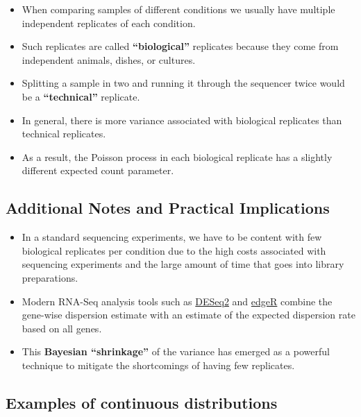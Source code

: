\documentclass[
]{book}
\providecommand{\tightlist}{%
  \setlength{\itemsep}{0pt}\setlength{\parskip}{0pt}}
\begin{document}
\begin{itemize}
\tightlist
\item
  When comparing samples of different conditions we usually have multiple independent replicates of each condition.
\item
  Such replicates are called \textbf{``biological''} replicates because they come from independent animals, dishes, or cultures.
\item
  Splitting a sample in two and running it through the sequencer twice would be a \textbf{``technical''} replicate.
\item
  In general, there is more variance associated with biological replicates than technical replicates.
\item
  As a result, the Poisson process in each biological replicate has a slightly different expected count parameter.
\end{itemize}

\hypertarget{additional-notes-and-practical-implications}{%
\subsection{Additional Notes and Practical Implications}\label{additional-notes-and-practical-implications}}

\begin{itemize}
\tightlist
\item
  In a standard sequencing experiments, we have to be content with few biological replicates per condition due to the high costs associated with sequencing experiments and the large amount of time that goes into library preparations.
\item
  Modern RNA-Seq analysis tools such as \href{https://bioconductor.org/packages/release/bioc/html/DESeq2.html}{DESeq2} and \href{https://bioconductor.org/packages/release/bioc/html/edgeR.html}{edgeR} combine the gene-wise dispersion estimate with an estimate of the expected dispersion rate based on all genes.
\item
  This \textbf{Bayesian ``shrinkage''} of the variance has emerged as a powerful technique to mitigate the shortcomings of having few replicates.
\end{itemize}

\hypertarget{examples-of-continuous-distributions}{%
\subsection{Examples of continuous distributions}\label{examples-of-continuous-distributions}}
\end{document}

